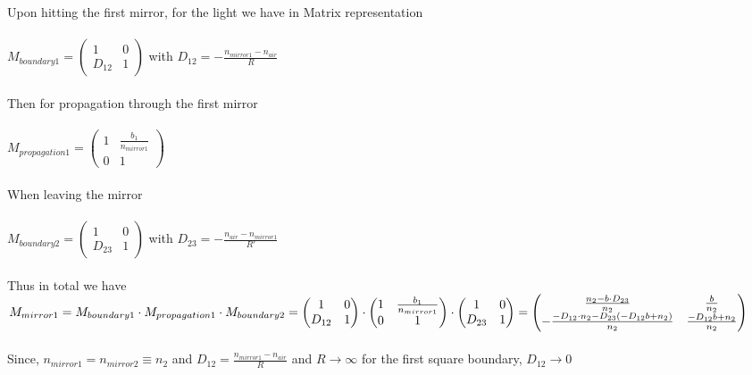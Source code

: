 \documentclass{article}
\begin{document}
Upon hitting the first mirror, for the light we have in Matrix representation
\\\\
$M_{boundary 1}= \begin{pmatrix}
1 & 0\\
D_{12}& 1
\end{pmatrix}$ with $D_{12} = -\frac{n_{mirror 1}-n_{air}}{R}$
\\\\
Then for propagation through the first mirror
\\\\
$M_{propagation 1}= \begin{pmatrix}
1 & \frac{b_1}{n_{mirror 1}}\\
0 & 1
\end{pmatrix}$
\\\\
When leaving the mirror
\\\\
$M_{boundary 2}= \begin{pmatrix}
1 & 0\\
D_{23} & 1
\end{pmatrix}$ with $D_{23} = -\frac{n_{air}-n_{mirror 1}}{R'}$
\\\\
Thus in total we have
$M_{mirror 1}= M_{boundary 1} \cdot M_{propagation 1} \cdot M_{boundary 2} 
\\\\
= \begin{pmatrix}
1 & 0\\
D_{12} & 1
\end{pmatrix} \cdot \begin{pmatrix}
1 & \frac{b_1}{n_{mirror 1}}\\
0 & 1
\end{pmatrix} \cdot \begin{pmatrix}
1 & 0\\
D_{23} & 1
\end{pmatrix}= \begin{pmatrix}
\frac{n_2-b \cdot D_{23}}{n_2} & \frac{b}{n_2}\\
-\frac{-D_{12} \cdot n_2 - D_{23}(-D_{12}b+n_2)}{n_2} & \frac{-D_{12}b+n_2}{n_2}
\end{pmatrix}$
\\\\
Since, $n_{mirror1} = n_{mirror 2} \equiv n_2$ and $D_{12} = \frac{n_{mirror 1}-n_{air}}{R}$ and $R \xrightarrow[]{} \infty$ for the first square boundary, $D_{12} \xrightarrow[]{} 0$
\end{document}
